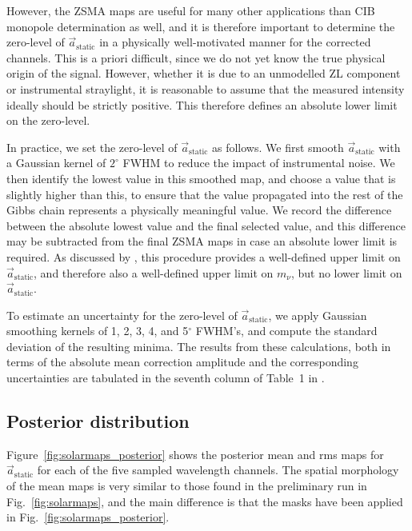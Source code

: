 \documentclass{aa}
\renewcommand{\a}[0]{\vec{a}}
\begin{document}
However, the ZSMA maps are useful for many other applications than CIB
monopole determination as well, and it is therefore important to
determine the zero-level of $\a_{\mathrm{static}}$ in a physically
well-motivated manner for the corrected channels. This is a priori
difficult, since we do not yet know the true physical origin of the
signal. However, whether it is due to an unmodelled ZL component or
instrumental straylight, it is reasonable to assume that the measured
intensity ideally should be strictly positive. This therefore defines
an absolute lower limit on the zero-level.

In practice, we set the zero-level of $\a_{\mathrm{static}}$ as
follows. We first smooth $\a_{\mathrm{static}}$ with a Gaussian kernel
of $2^{\circ}$ FWHM to reduce the impact of instrumental noise. We
then identify the lowest value in this smoothed map, and choose a
value that is slightly higher than this, to ensure that the value
propagated into the rest of the Gibbs chain represents a physically
meaningful value. We record the difference between the absolute lowest
value and the final selected value, and this difference may be
subtracted from the final ZSMA maps in case an absolute lower limit is
required. As discussed by \citet{CG02_03}, this procedure provides a
well-defined upper limit on $\a_{\mathrm{static}}$, and therefore also
a well-defined upper limit on $m_{\nu}$, but no lower limit on
$\a_{\mathrm{static}}$. 

To estimate an uncertainty for the zero-level of
$\a_{\mathrm{static}}$, we apply Gaussian smoothing kernels of 1, 2,
3, 4, and 5$^{\circ}$ FWHM's, and compute the standard deviation of the
resulting minima. The results from these calculations, both in terms
of the absolute mean correction amplitude and the corresponding
uncertainties are tabulated in the seventh column of Table~1 in
\citet{CG02_03}.

\subsection{Posterior distribution}

Figure~\ref{fig:solarmaps_posterior} shows the posterior mean and rms
maps for $\a_{\mathrm{static}}$ for each of the five sampled
wavelength channels. The spatial morphology of the mean maps is very
similar to those found in the preliminary run in
Fig.~\ref{fig:solarmaps}, and the main difference is that the masks
have been applied in Fig.~\ref{fig:solarmaps_posterior}.
\end{document}
